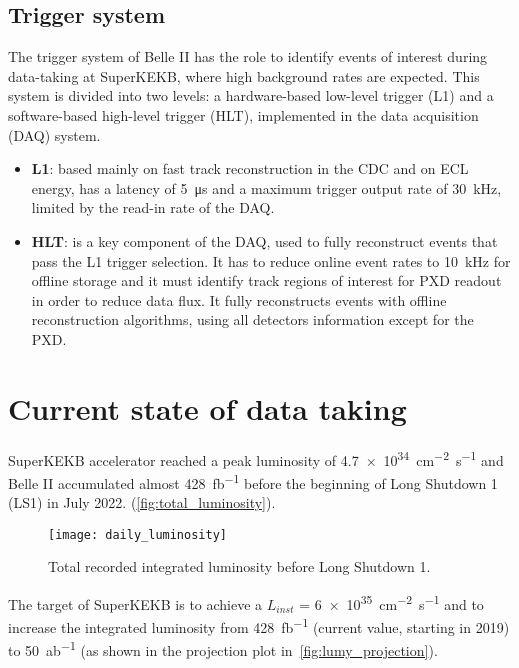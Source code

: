 \subsection{Trigger system}

The trigger system of Belle II has the role to identify events of interest during data-taking at SuperKEKB, where high background rates are expected. 
This system is divided into two levels: a hardware-based low-level trigger (L1) and a software-based high-level trigger (HLT), implemented in the data acquisition (DAQ) system. 

\begin{itemize}
\item \textbf{L1}: based mainly on fast track reconstruction in the CDC and on ECL energy, has a latency of \SI{5}{\micro s} and a maximum trigger output rate of \SI{30}{kHz}, limited by the read-in rate of the DAQ.
\item \textbf{HLT}: is a key component of the DAQ, used to fully reconstruct events that pass the L1 trigger selection. It has to reduce online event rates to \SI{10}{kHz} for offline storage and it must identify track regions of interest for PXD readout in order to reduce data flux. It fully reconstructs events with offline reconstruction algorithms, using all detectors information except for the PXD.
\end{itemize}



\section{Current state of data taking} \label{sec:perspectives}

SuperKEKB accelerator reached a peak luminosity of \SI{4.7e34}{cm^{-2}s^{-1}} and Belle II accumulated almost \SI{428}{\femto b^{-1}} before the beginning of Long Shutdown 1 (LS1) in July 2022. (\autoref{fig:total_luminosity}).

\begin{figure}[h!]
\centering
\texttt{[image: daily\_luminosity]}
\caption{Total recorded integrated luminosity before Long Shutdown 1.}
\label{fig:total_luminosity}
\end{figure}

The target of SuperKEKB is to achieve a \textit{$L_{inst}$} = \SI{6e35}{cm^{-2}s^{-1}} and to increase the integrated luminosity from \SI{428}{\femto b^{-1}} (current value, starting in 2019) to \SI{50}{ab^{-1}} (as shown in the projection plot in~\autoref{fig:lumy_projection}).\\

